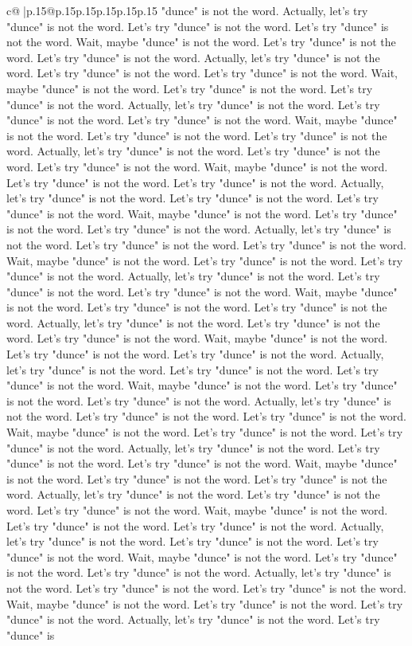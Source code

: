 \documentclass{article}
\begin{document}
{\begin{supertabular}{c@{$\;$}|p{.15\linewidth}@{}p{.15\linewidth}p{.15\linewidth}p{.15\linewidth}p{.15\linewidth}p{.15\linewidth}}
{{{"dunce" is not the word. Actually, let's try "dunce" is not the word. Let's try "dunce" is not the word. Let's try "dunce" is not the word. Wait, maybe "dunce" is not the word. Let's try "dunce" is not the word. Let's try "dunce" is not the word. Actually, let's try "dunce" is not the word. Let's try "dunce" is not the word. Let's try "dunce" is not the word. Wait, maybe "dunce" is not the word. Let's try "dunce" is not the word. Let's try "dunce" is not the word. Actually, let's try "dunce" is not the word. Let's try "dunce" is not the word. Let's try "dunce" is not the word. Wait, maybe "dunce" is not the word. Let's try "dunce" is not the word. Let's try "dunce" is not the word. Actually, let's try "dunce" is not the word. Let's try "dunce" is not the word. Let's try "dunce" is not the word. Wait, maybe "dunce" is not the word. Let's try "dunce" is not the word. Let's try "dunce" is not the word. Actually, let's try "dunce" is not the word. Let's try "dunce" is not the word. Let's try "dunce" is not the word. Wait, maybe "dunce" is not the word. Let's try "dunce" is not the word. Let's try "dunce" is not the word. Actually, let's try "dunce" is not the word. Let's try "dunce" is not the word. Let's try "dunce" is not the word. Wait, maybe "dunce" is not the word. Let's try "dunce" is not the word. Let's try "dunce" is not the word. Actually, let's try "dunce" is not the word. Let's try "dunce" is not the word. Let's try "dunce" is not the word. Wait, maybe "dunce" is not the word. Let's try "dunce" is not the word. Let's try "dunce" is not the word. Actually, let's try "dunce" is not the word. Let's try "dunce" is not the word. Let's try "dunce" is not the word. Wait, maybe "dunce" is not the word. Let's try "dunce" is not the word. Let's try "dunce" is not the word. Actually, let's try "dunce" is not the word. Let's try "dunce" is not the word. Let's try "dunce" is not the word. Wait, maybe "dunce" is not the word. Let's try "dunce" is not the word. Let's try "dunce" is not the word. Actually, let's try "dunce" is not the word. Let's try "dunce" is not the word. Let's try "dunce" is not the word. Wait, maybe "dunce" is not the word. Let's try "dunce" is not the word. Let's try "dunce" is not the word. Actually, let's try "dunce" is not the word. Let's try "dunce" is not the word. Let's try "dunce" is not the word. Wait, maybe "dunce" is not the word. Let's try "dunce" is not the word. Let's try "dunce" is not the word. Actually, let's try "dunce" is not the word. Let's try "dunce" is not the word. Let's try "dunce" is not the word. Wait, maybe "dunce" is not the word. Let's try "dunce" is not the word. Let's try "dunce" is not the word. Actually, let's try "dunce" is not the word. Let's try "dunce" is not the word. Let's try "dunce" is not the word. Wait, maybe "dunce" is not the word. Let's try "dunce" is not the word. Let's try "dunce" is not the word. Actually, let's try "dunce" is not the word. Let's try "dunce" is not the word. Let's try "dunce" is not the word. Wait, maybe "dunce" is not the word. Let's try "dunce" is not the word. Let's try "dunce" is not the word. Actually, let's try "dunce" is not the word. Let's try "dunce" is }}}
\end{supertabular}}
\end{document}
